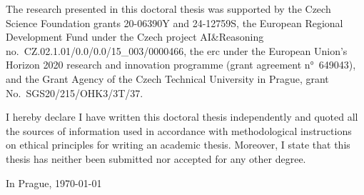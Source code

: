 \begin{thanks}

The research presented in this doctoral thesis was supported by
the Czech Science Foundation grants 20-06390Y and 24-12759S,
the European Regional Development Fund under the Czech project AI\&Reasoning no.~CZ.02.1.01/0.0/0.0/15\_003/0000466,
the \gls{erc} under the European Union's Horizon 2020 research and innovation programme (grant agreement n°~649043), and
the Grant Agency of the Czech Technical University in Prague, grant No.~SGS20/215/OHK3/3T/37.
\end{thanks}

\begin{declaration}
I hereby declare I have written this doctoral thesis independently and quoted all the sources of information used in accordance with methodological instructions on ethical principles for writing an academic thesis. Moreover, I state that this thesis has neither been submitted nor accepted for any other degree.

In Prague, \today
\end{declaration}

\begin{abstract-english}




\end{abstract-english}

\begin{abstract-czech}

\end{abstract-czech}


\hypersetup{hidelinks}
